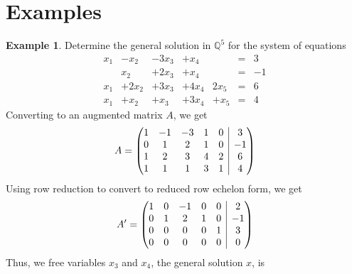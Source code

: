 \documentclass[letterpaper,12pt]{article}
\makeatletter
\theoremstyle{definition}
\newtheorem*{example}{Example}
\newenvironment{amatrix}[1]{\left(\begin{array}{@{}*{#1}{c}|c@{}}}{\end{array}\right)}
\makeatother
\begin{document}
\section*{Examples}
\begin{example}
Determine the general solution in $\mathbb{Q}^5$ for the system of equations
\begin{equation*}
    \begin{array}{rrrrrrrr}
    x_1 & -x_2 & -3x_3 & +x_4 & & = & 3 \\
    & x_2 & +2x_3 & +x_4 & & = & -1 \\
    x_1 & +2x_2 & +3x_3 & +4x_4 & 2x_5 & = & 6 \\
    x_1 & +x_2 & +x_3 & +3x_4 & +x_5 & = & 4
    \end{array}
\end{equation*}
Converting to an augmented matrix $A$, we get
\begin{equation*}
    A = \begin{amatrix}{5}
    1 & -1 & -3 & 1 & 0 & 3 \\
    0 & 1 & 2 & 1 & 0 & -1 \\
    1 & 2 & 3 & 4 & 2 & 6 \\
    1 & 1 & 1 & 3 & 1 & 4
    \end{amatrix}
\end{equation*}
Using row reduction to convert to reduced row echelon form, we get
\begin{equation*}
    A' = \begin{amatrix}{5}
    1 & 0 & -1 & 0 & 0 & 2 \\
    0 & 1 & 2 & 1 & 0 & -1 \\
    0 & 0 & 0 & 0 & 1 & 3 \\
    0 & 0 & 0 & 0 & 0 & 0
    \end{amatrix}
\end{equation*}
Thus, we free variables $x_3$ and $x_4$, the general solution $x$, is
\begin{equation*}

\end{equation*}
\end{example}
\end{document}
